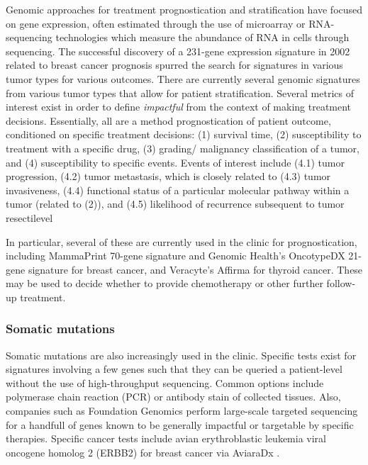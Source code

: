       Genomic approaches for treatment prognostication and
      stratification have focused on gene expression, often estimated through the use of microarray
      or RNA-sequencing technologies which measure the abundance of
      RNA in cells through sequencing. The successful discovery of a 231-gene expression signature in 2002 related to breast
      cancer prognosis\cite{van_t_veer_gene_2002} spurred the search for signatures in various
      tumor types for various outcomes. There are currently several genomic signatures from various
      tumor types that allow for patient stratification. Several
      metrics of interest exist in order to define \textit{impactful}
     from the context of making treatment decisions. Essentially, all
     are a method prognostication of patient outcome, conditioned on
     specific treatment decisions:
      (1) survival time, (2) susceptibility to treatment with a
      specific drug, (3) grading/ malignancy classification of a
      tumor, and (4) susceptibility to specific events. Events of
      interest include (4.1) tumor progression, (4.2) tumor
      metastasis, which is closely related to (4.3) tumor
      invasiveness, (4.4) functional status of a particular
      molecular pathway within a tumor (related to (2)), and (4.5)
      likelihood of recurrence subsequent to tumor resectilevel
      
      In particular, several of these are currently used in the
      clinic for prognostication, including
      MammaPrint\textsuperscript{\textregistered} 70-gene signature and 
      Genomic Health's OncotypeDX\textsuperscript{\textregistered}
      21-gene signature for
      breast cancer,
      and Veracyte's Affirma\textsuperscript{\textregistered} for
      thyroid cancer. These may be used to decide whether to provide
      chemotherapy or other further follow-up treatment.

      \subsubsection{Somatic mutations}
      Somatic mutations are also increasingly used in the
      clinic. Specific tests exist for signatures involving a few
      genes such that they can be queried a patient-level without the use of
      high-throughput sequencing. Common options include polymerase
      chain reaction (PCR) or antibody stain of collected
      tissues. Also, companies such as Foundation Genomics
      \textsuperscript{\textregistered} perform large-scale targeted
      sequencing for a handfull of genes known to be generally
      impactful or targetable by specific therapies. Specific cancer
      tests include avian erythroblastic leukemia viral oncogene
      homolog 2 (ERBB2) for breast cancer via AviaraDx \textsuperscript{\textregistered}.

